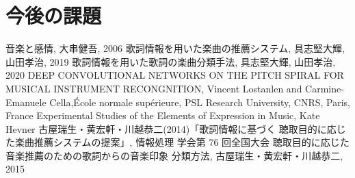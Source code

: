 \documentclass[twocolumn,twoside,9.5pt]{jarticle}
\begin{document}
\section{今後の課題}

\begin{thebibliography}{9}

 音楽と感情, 大串健吾, 2006
 歌詞情報を用いた楽曲の推薦システム, 具志堅大輝, 山田孝治, 2019
 歌詞情報を用いた歌詞の楽曲分類手法, 具志堅大輝, 山田孝治, 2020
 DEEP CONVOLUTIONAL NETWORKS ON THE PITCH SPIRAL FOR MUSICAL INSTRUMENT RECONGNITION, Vincent Lostanlen and Carmine-Emanuele Cella,\'{E}cole normale sup\'{e}rieure, PSL Research University, CNRS, Paris, France
 Experimental Studies of the Elements of Expression in Music, Kate Hevner
 古屋瑞生・黄宏軒・川越恭二(2014)「歌詞情報に基づく 聴取目的に応じた楽曲推薦システムの提案」, 情報処理 学会第 76 回全国大会
 聴取目的に応じた音楽推薦のための歌詞からの音楽印象 分類方法, 古屋瑞生・黄宏軒・川越恭二, 2015


\end{thebibliography}
\end{document}
